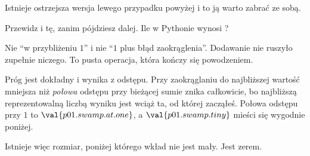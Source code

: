 \begin{fr}
Istnieje ostrzejsza wersja lewego przypadku powyżej i to ją warto zabrać ze
sobą.

Przewidz i tę, zanim pójdziesz dalej. Ile w Pythonie wynosi
?
\nextframe
\end{fr}

\begin{fr}
Nie \enquote{w przybliżeniu $1$} i nie \enquote{$1$ plus błąd zaokrąglenia}.
Dodawanie nie ruszyło zupełnie niczego. To pusta operacja, która kończy się
powodzeniem.

Próg jest dokładny i wynika z odstępu. Przy zaokrąglaniu do najbliższej
wartość mniejsza niż \emph{połowa} odstępu przy bieżącej sumie znika
całkowicie, bo najbliższą reprezentowalną liczbą wyniku jest wciąż ta, od
której zacząłeś. Połowa odstępu przy $1$ to $\val{p01.swamp.at.one}$, a
$\val{p01.swamp.tiny}$ mieści się wygodnie poniżej.

Istnieje więc rozmiar, poniżej którego wkład nie jest mały. Jest zerem.
\end{fr}

